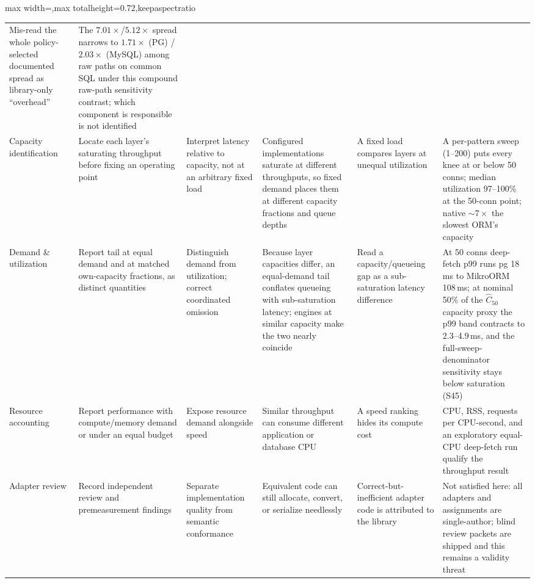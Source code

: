 \begin{table}[htbp]
\begin{adjustbox}{max width=\textwidth,max totalheight=0.72\textheight,keepaspectratio}
\begin{tabular}{p{1.7cm} p{2.3cm} p{2.5cm} p{3.3cm} p{2.5cm} p{3.4cm}}
    Mis-read the whole policy-selected documented spread as library-only ``overhead'' &
    The $7.01\times$/$5.12\times$ spread narrows to $1.71\times$ (PG) / $2.03\times$ (MySQL) among raw paths on common SQL under this compound raw-path sensitivity contrast; which component is responsible is not identified \\
    \addlinespace
    Capacity identification &
    Locate each layer's saturating throughput before fixing an operating point &
    Interpret latency relative to capacity, not at an arbitrary fixed load &
    Configured implementations saturate at different throughputs, so fixed demand places them at different capacity fractions and queue depths &
    A fixed load compares layers at unequal utilization &
    A per-pattern sweep (1--200) puts every knee at or below 50 conns; median utilization 97--100\% at the 50-conn point; native $\sim$$7\times$ the slowest ORM's capacity \\
    \addlinespace
    Demand \& utilization &
    Report tail at equal demand and at matched own-capacity fractions, as distinct quantities &
    Distinguish demand from utilization; correct coordinated omission &
    Because layer capacities differ, an equal-demand tail conflates queueing with sub-saturation latency; engines at similar capacity make the two nearly coincide &
    Read a capacity/queueing gap as a sub-saturation latency difference &
    At 50 conns deep-fetch p99 runs pg 18\,ms to MikroORM 108\,ms; at nominal 50\% of the $\widehat C_{50}$ capacity proxy the p99 band contracts to 2.3--4.9\,ms, and the full-sweep-denominator sensitivity stays below saturation (S45) \\
    \addlinespace
    Resource accounting &
    Report performance with compute/memory demand or under an equal budget &
    Expose resource demand alongside speed &
    Similar throughput can consume different application or database CPU &
    A speed ranking hides its compute cost &
    CPU, RSS, requests per CPU-second, and an exploratory equal-CPU deep-fetch run qualify the throughput result \\
    \addlinespace
    Adapter review &
    Record independent review and premeasurement findings &
    Separate implementation quality from semantic conformance &
    Equivalent code can still allocate, convert, or serialize needlessly &
    Correct-but-inefficient adapter code is attributed to the library &
    Not satisfied here: all adapters and assignments are single-author; blind review packets are shipped and this remains a validity threat \\
    \bottomrule
  \end{tabular}
  \end{adjustbox}
\end{table}
